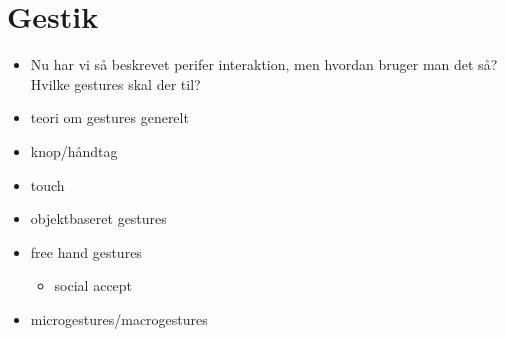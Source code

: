 \section{Gestik}
\label{Gestik}
%
 


\begin{itemize}
	\item Nu har vi så beskrevet perifer interaktion, men hvordan bruger man det så? Hvilke gestures skal der til?
	\item teori om gestures generelt
	\item knop/håndtag
	\item touch
	\item objektbaseret gestures
	\item free hand gestures
	\begin{itemize}
		\item social accept
	\end{itemize}
	\item microgestures/macrogestures
\end{itemize}
